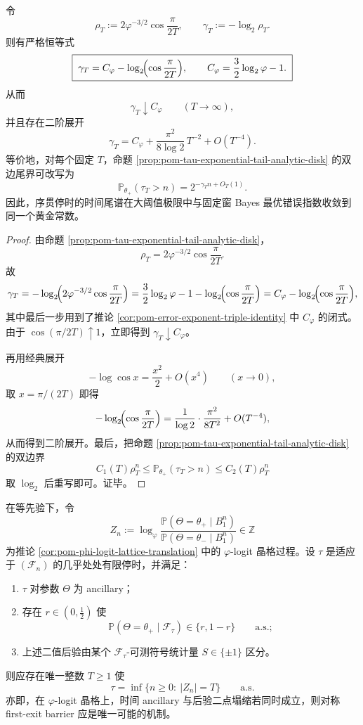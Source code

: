 \begin{theorem}\label{thm:conclusion-golden-sprt-tail-exponent-chernoff-identity}
令
\[
\rho_T:=2\varphi^{-3/2}\cos\frac{\pi}{2T},
\qquad
\gamma_T:=-\log_2\rho_T.
\]
则有严格恒等式
\[
\boxed{\;
\gamma_T
=
C_\varphi-\log_2\!\Bigl(\cos\frac{\pi}{2T}\Bigr),
\qquad
C_\varphi=\frac32\log_2\varphi-1.
\;}
\]
从而
\[
\gamma_T\downarrow C_\varphi
\qquad (T\to\infty),
\]
并且存在二阶展开
\[
\boxed{\;
\gamma_T
=
C_\varphi+\frac{\pi^2}{8\log 2}\,T^{-2}+O(T^{-4}).
\;}
\]
等价地，对每个固定 \(T\)，命题 \ref{prop:pom-tau-exponential-tail-analytic-disk} 的双边尾界可改写为
\[
\mathbb P_{\theta_+}(\tau_T>n)=2^{-\gamma_T n+O_T(1)}.
\]
因此，序贯停时的时间尾谱在大阈值极限中与固定窗 Bayes 最优错误指数收敛到同一个黄金常数。
\end{theorem}
\begin{proof}
由命题 \ref{prop:pom-tau-exponential-tail-analytic-disk}，
\[
\rho_T=2\varphi^{-3/2}\cos\frac{\pi}{2T}.
\]
故
\[
\gamma_T
=
-\log_2\!\Bigl(2\varphi^{-3/2}\cos\frac{\pi}{2T}\Bigr)
=
\frac32\log_2\varphi-1-\log_2\!\Bigl(\cos\frac{\pi}{2T}\Bigr)
=
C_\varphi-\log_2\!\Bigl(\cos\frac{\pi}{2T}\Bigr),
\]
其中最后一步用到了推论 \ref{cor:pom-error-exponent-triple-identity} 中 \(C_\varphi\) 的闭式。
由于 \(\cos(\pi/2T)\uparrow 1\)，立即得到 \(\gamma_T\downarrow C_\varphi\)。

再用经典展开
\[
-\log\cos x=\frac{x^2}{2}+O(x^4)
\qquad(x\to0),
\]
取 \(x=\pi/(2T)\) 即得
\[
-\log_2\!\Bigl(\cos\frac{\pi}{2T}\Bigr)
=
\frac{1}{\log 2}\cdot \frac{\pi^2}{8T^2}+O(T^{-4}),
\]
从而得到二阶展开。最后，把命题 \ref{prop:pom-tau-exponential-tail-analytic-disk} 的双边界
\[
C_1(T)\rho_T^n\le \mathbb P_{\theta_+}(\tau_T>n)\le C_2(T)\rho_T^n
\]
取 \(\log_2\) 后重写即可。证毕。
\end{proof}



\begin{conjecture}[辅助时间刚性]\label{conj:conclusion-golden-sprt-ancillary-time-rigidity}
在等先验下，令
\[
Z_n:=\log_\varphi
\frac{\mathbb P(\Theta=\theta_+\mid B_1^n)}
{\mathbb P(\Theta=\theta_-\mid B_1^n)}
\in\mathbb Z
\]
为推论 \ref{cor:pom-phi-logit-lattice-translation} 中的 \(\varphi\)-logit 晶格过程。设 \(\tau\) 是适应于 \((\mathcal F_n)\) 的几乎处处有限停时，并满足：
\begin{enumerate}
  \item \(\tau\) 对参数 \(\Theta\) 为 ancillary；
  \item 存在 \(r\in(0,\frac12)\) 使
  \[
  \mathbb P(\Theta=\theta_+\mid \mathcal F_\tau)\in\{r,1-r\}
  \qquad\text{a.s.};
  \]
  \item 上述二值后验由某个 \(\mathcal F_\tau\)-可测符号统计量 \(S\in\{\pm1\}\) 区分。
\end{enumerate}
则应存在唯一整数 \(T\ge 1\) 使
\[
\tau=\inf\{n\ge 0:\ |Z_n|=T\}
\qquad\text{a.s.}
\]
亦即，在 \(\varphi\)-logit 晶格上，时间 ancillary 与后验二点塌缩若同时成立，则对称 first-exit barrier 应是唯一可能的机制。
\end{conjecture}

\endinput
